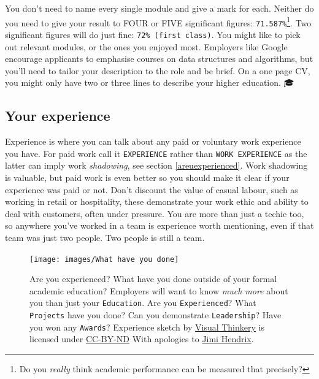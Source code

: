 \documentclass[
]{book}
\begin{document}
You don't need to name every single module and give a mark for each. Neither do you need to give your result to FOUR or FIVE significant figures: \texttt{71.587\%}\footnote{Do you \emph{really} think academic performance can be measured that precisely?}. Two significant figures will do just fine: \texttt{72\%\ (first\ class)}. You might like to pick out relevant modules, or the ones you enjoyed most. Employers like Google encourage applicants to emphasise courses on data structures and algorithms, but you'll need to tailor your description to the role and be brief. On a one page CV, you might only have two or three lines to describe your higher education. 🎓

\hypertarget{mycvex}{%
\subsection{Your experience}\label{mycvex}}

Experience is where you can talk about any paid or voluntary work experience you have. For paid work call it \texttt{EXPERIENCE} rather than \texttt{WORK\ EXPERIENCE} as the latter can imply work \emph{shadowing}, see section \ref{areuexperienced}. Work shadowing is valuable, but paid work is even better so you should make it clear if your experience was paid or not. Don't discount the value of casual labour, such as working in retail or hospitality, these demonstrate your work ethic and ability to deal with customers, often under pressure. You are more than just a techie too, so anywhere you've worked in a team is experience worth mentioning, even if that team was just two people. Two people is still a team.

\begin{figure}

{\centering \texttt{[image: images/What have you done]} 

}

\caption{Are you experienced? What have you done outside of your formal academic education? Employers will want to know \emph{much more} about you than just your \texttt{Education}. Are you \texttt{Experienced}? What \texttt{Projects} have you done? Can you demonstrate \texttt{Leadership}? Have you won any \texttt{Awards}? Experience sketch by \href{https://visualthinkery.com/}{Visual Thinkery} is licensed under \href{https://creativecommons.org/licenses/by-nd/4.0/}{CC-BY-ND} With apologies to \href{https://en.wikipedia.org/wiki/Jimi_Hendrix}{Jimi Hendrix}. \citep{hendrix}}\label{fig:done-fig}
\end{figure}
\end{document}
